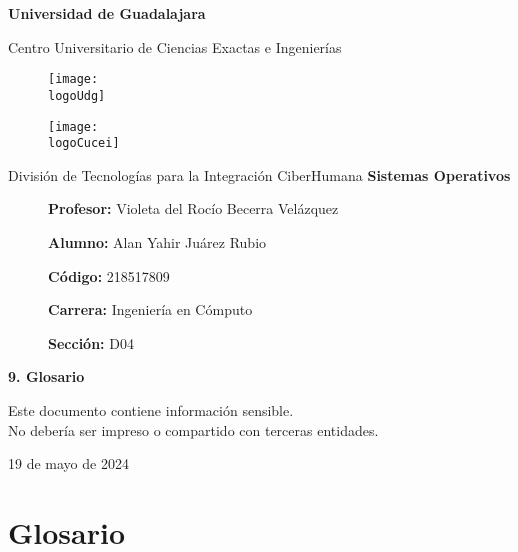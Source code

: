 \documentclass[12pt, a4paper]{article} %
\title{\theTitle}
\author{\theAuthor}
\newcommand{\logoUdg}{../../../../attachments/images/portada-udg.jpeg}
\newcommand{\logoCucei}{../../../../attachments/images/portada-cucei.jpeg}
\newcommand{\materia}{Sistemas Operativos}
\newcommand{\theTitle}{9. Glosario}
\newcommand{\profesor}{Violeta del Rocío Becerra Velázquez}
\newcommand{\theAuthor}{Alan Yahir Juárez Rubio}
\newcommand{\code}{218517809}
\newcommand{\carrera}{Ingeniería en Cómputo}
\newcommand{\seccion}{D04}
\newcommand{\startDate}{19 de mayo de 2024}
\newcommand{\nl}{\par\vspace{0.4cm}}
\begin{document}
\cfoot{\ifodd\value{page}\else\thepage\fi} %

\begin{titlepage}
	\centering
	{\huge\textbf{Universidad de Guadalajara}}\par\vspace{0.6cm}
	{\LARGE{Centro Universitario de Ciencias Exactas e Ingenierías}}\vfill
	
	\begin{figure}[h]
		\begin{minipage}[t]{0.45\textwidth}
			\centering
			\texttt{[image: \\logoUdg]}
		\end{minipage}
		\hfill
		\begin{minipage}[t]{0.45\textwidth}
			\centering
			\texttt{[image: \\logoCucei]}
		\end{minipage}
	\end{figure}\vfill
	
	{\Large{División de Tecnologías para la Integración CiberHumana}}\vfill
	{\Large\textbf{\materia}}\vfill
	\begin{figure}[h]
		\centering
		\begin{minipage}[t]{0.75\textwidth}
			{\Large
				\textbf{Profesor:} \profesor\nl
				\textbf{Alumno:} \theAuthor\nl
				\textbf{Código:} \code\nl
				\textbf{Carrera:} \carrera\nl
				\textbf{Sección:} \seccion
			}
		\end{minipage}
	\end{figure}\vfill
	{\LARGE{\textbf{\theTitle}}}\vfill
	
	\begin{tcolorbox}[colback=red!5!white, colframe=red!75!black]
		\centering
		Este documento contiene información sensible.\\
		No debería ser impreso o compartido con terceras entidades.
	\end{tcolorbox}\vfill
	{\large \startDate}\par
\end{titlepage}

\clearpage
\tableofcontents

	

\clearpage
\section{Glosario}
\end{document}
